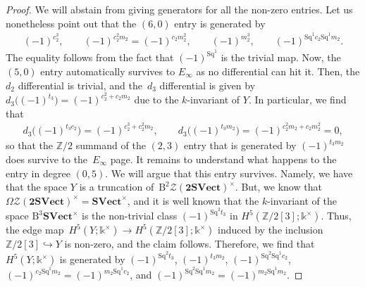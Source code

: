 \documentclass[10pt,a4paper]{amsart}
\numberwithin{equation}{section}
\begin{document}
\begin{proof}
We will abstain from giving generators for all the non-zero entries. Let us nonetheless point out that the $(6,0)$ entry is generated by
\begin{gather*}
(-1)^{c_2^3},\qquad (-1)^{c_2^2m_2}=(-1)^{c_2m_2^2},\qquad (-1)^{m_2^3},\qquad (-1)^{\mathrm{Sq}^1c_2 \mathrm{Sq}^1m_2}.
\end{gather*}
 The equality follows from the fact that $(-1)^{\mathrm{Sq}^1}$ is the trivial map. Now, the $(5,0)$ entry automatically survives to $E_{\infty}$ as no differential can hit it. Then, the $d_2$ differential is trivial, and the~$d_3$ differential is given by $d_3\big((-1)^{t_3}\big)=(-1)^{c_2^2+c_2m_2}$ due to the $k$-invariant of $Y$. In particular, we find that
 \begin{gather*}
 d_3\big((-1)^{t_3c_2}\big)=(-1)^{c_2^3+c_2^2m_2},\qquad d_3\big((-1)^{t_3m_2}\big)=(-1)^{c_2^2m_2+c_2m_2^2}=0,
 \end{gather*}
 so that the $\mathbb{Z}/2$ summand of the $(2,3)$ entry that is generated by $(-1)^{t_3m_2}$ does survive to the~$E_{\infty}$ page. It remains to understand what happens to the entry in degree $(0,5)$. We will argue that this entry survives. Namely, we have that the space $Y$ is a truncation of~$\mathrm{B}^2\mathscr{Z}(\mathbf{2SVect})^{\times}$. But, we know that $\Omega\mathscr{Z}(\mathbf{2SVect})^{\times}=\mathbf{SVect}^{\times}$, and it is well known that the $k$-invariant of the space $\mathrm{B}^3\mathbf{SVect}^{\times}$ is the non-trivial class $(-1)^{\mathrm{Sq}^2t_3}$ in $H^5(\mathbb{Z}/2[3];\mathds{k}^{\times})$. Thus, the edge map~$H^5(Y;\mathds{k}^{\times})\rightarrow H^5(\mathbb{Z}/2[3];\mathds{k}^{\times})$ induced by the inclusion $\mathbb{Z}/2[3]\hookrightarrow Y$ is non-zero, and the claim follows. Therefore, we find that $H^5(Y;\mathds{k}^{\times})$ is generated by $(-1)^{\mathrm{Sq}^2t_3}$, $(-1)^{t_3m_2}$, $(-1)^{\mathrm{Sq}^2\mathrm{Sq}^1c_2}$, $(-1)^{c_2\mathrm{Sq}^1m_2}=(-1)^{m_2\mathrm{Sq}^1c_2}$, and $(-1)^{\mathrm{Sq}^2\mathrm{Sq}^1m_2}=(-1)^{m_2\mathrm{Sq}^1m_2}$.


\end{proof}
\end{document}
